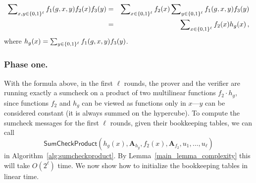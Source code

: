 \begin{eqnarray}
 \sum\nolimits_{x,y\in\{0,1\}^\ell}f_1(g,x,y)f_2(x)f_3(y)&=&\sum\nolimits_{x\in\{0,1\}^\ell}f_2(x)\sum\nolimits_{y\in\{0,1\}^\ell}f_1(g,x,y) f_3(y)\nonumber\\
&=& \sum\nolimits_{x\in\{0,1\}^\ell}f_2(x)   h_g(x)\nonumber\,,
\end{eqnarray}
where $h_g(x) = \sum_{y\in\{0,1\}^\ell}f_1(g,x,y) f_3(y)$. 


\subsubsection{Phase one.} With the formula above, in the first $\ell$ rounds, the prover and the verifier are running exactly a sumcheck on a product of two multilinear functions $f_2\cdot h_g$, since functions $f_2$ and $h_g$ can be viewed as functions only in $x$---$y$ can be considered constant (it is always summed on the hypercube). To compute the sumcheck messages for the first $\ell$ rounds, given their bookkeeping tables, we can call $$\textsf{SumCheckProduct}(h_g(x), \textbf{A}_{h_g},f_2(x),\textbf{A}_{f_2}, u_1,\ldots,u_\ell)$$ in Algorithm~\ref{alg:sumcheckproduct}. By Lemma~\ref{main_lemma_complexity} this will take $O(2^\ell)$ time. We now show how to initialize the bookkeeping tables in linear time.

